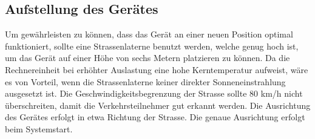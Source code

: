 \subsection{Aufstellung des Gerätes}
Um gewährleisten zu können, dass das Gerät an einer neuen Position optimal funktioniert, sollte eine Strassenlaterne benutzt werden, welche genug hoch ist, um das Gerät auf einer Höhe von sechs Metern platzieren zu können. Da die Rechnereinheit bei erhöhter Auslastung eine hohe Kerntemperatur aufweist, wäre es von Vorteil, wenn die Strassenlaterne keiner direkter Sonneneinstrahlung ausgesetzt ist. Die Geschwindigkeitsbegrenzung der Strasse sollte 80 km/h nicht überschreiten, damit die Verkehrsteilnehmer gut erkannt werden. Die Ausrichtung des Gerätes erfolgt in etwa Richtung der Strasse. Die genaue Ausrichtung erfolgt beim Systemstart.